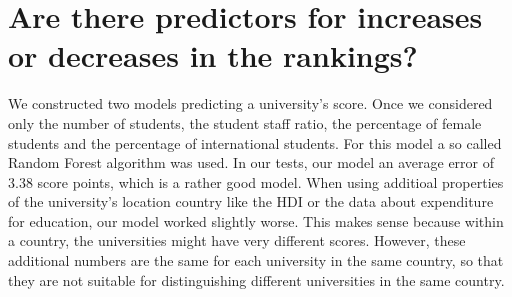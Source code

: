\documentclass{article}
\begin{document}
\section*{\large{Are there predictors for increases or decreases in the rankings?}}
We constructed two models predicting a university's score. Once we considered only the number of students, the student staff ratio, the percentage of female students and the percentage of international students. For this model a so called Random Forest algorithm was used. In our tests, our model an average error of 3.38 score points, which is a rather good model. When using additioal properties of the university's location country like the HDI or the data about expenditure for education, our model worked slightly worse. This makes sense because within a country, the universities might have very different scores. However, these additional numbers are the same for each university in the same country, so that they are not suitable for distinguishing different universities in the same country.
\end{document}
